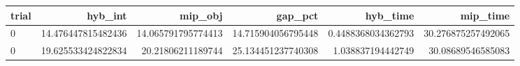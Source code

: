 \begin{tabular}{lrrrrr}
\hline
trial & hyb_int & mip_obj & gap_pct & hyb_time & mip_time \\ \hline
0 & 14.476447815482436 & 14.065791795774413 & 14.715904056795448 & 0.4488368034362793 & 30.276875257492065 \\
0 & 19.625533424822834 & 20.21806211189744 & 25.134451237740308 & 1.038837194442749 & 30.08689546585083 \\
\hline
\end{tabular}
